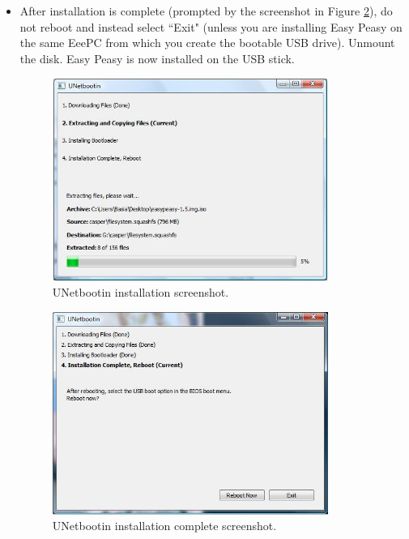 \begin{enumerate}
\begin{itemize}
\item After installation is complete (prompted by the screenshot in Figure \ref{fig:unetboot_install_complete}), do not reboot and instead select ``Exit" (unless you are installing Easy Peasy on the same EeePC from which you create the bootable USB drive). Unmount the disk. Easy Peasy is now installed on the USB stick.
\begin{figure}[!h]
\centering
\includegraphics[width=0.85\textwidth]{figures/2_unet_windows1.jpg}
\caption{UNetbootin installation screenshot.}
\label{fig:unetboot_install}
\end{figure}

\begin{figure}[!h]
\centering
\includegraphics[width=0.85\textwidth]{figures/2_installation_complete.jpg}
\caption{UNetbootin installation complete screenshot.}
\label{fig:unetboot_install_complete}
\end{figure}

\end{itemize}


\end{enumerate}
